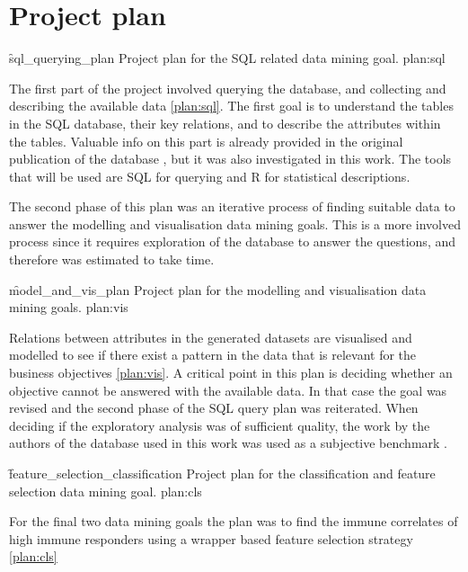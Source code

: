 \section{Project plan}

\f{sql_querying_plan}
{Project plan for the SQL related data mining goal.}
{plan:sql}

The first part of the project involved querying the database, and collecting
and describing the available data \autoref{plan:sql}. The first goal is to
understand the tables in the SQL database, their key relations, and to describe
the attributes within the tables. Valuable info on this part is already
provided in the original publication of the database
\cite{tomicFluPRINTDatasetMultidimensional2019}, but it was also investigated
in this work. The tools that will be used are SQL for querying and R for
statistical descriptions.

The second phase of this plan was an iterative process of finding suitable data
to answer the modelling and visualisation data mining goals. This is a more
involved process since it requires exploration of the database to answer the
questions, and therefore was estimated to take time.

\f{model_and_vis_plan}
{Project plan for the modelling and visualisation data mining goals.}
{plan:vis}

Relations between attributes in the generated datasets are visualised and
modelled to see if there exist a pattern in the data that is relevant for the
business objectives \autoref{plan:vis}. A critical point in this plan is
deciding whether an objective cannot be answered with the available data. In
that case the goal was revised and the second phase of the SQL query plan was
reiterated. When deciding if the exploratory analysis was of sufficient
quality, the work by the authors of the database used in this work was used as
a subjective benchmark \cite{tomicSIMONAutomatedMachine2019,
tomicFluPRINTDatasetMultidimensional2019}.

\f{feature_selection_classification}
{Project plan for the classification and feature selection data mining goal.}
{plan:cls}

For the final two data mining goals the plan was to find the immune correlates
of high immune responders using a wrapper based feature selection strategy
\autoref{plan:cls}

\printbibliography

